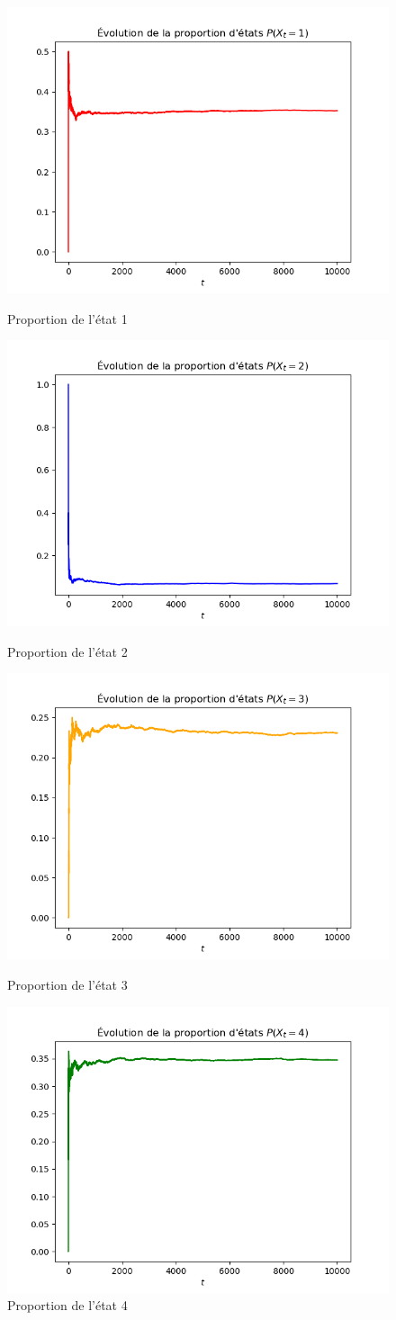\begin{figure}[ht] 
  \begin{minipage}[b]{0.5\linewidth}
    \centering
    \includegraphics[width=.5\linewidth]{figs/evo1.png} 
    \caption{Proportion de l'état 1} 
    \vspace{4ex}
  \end{minipage}%
  \begin{minipage}[b]{0.5\linewidth}
    \centering
    \includegraphics[width=.5\linewidth]{figs/evo2.png} 
    \caption{Proportion de l'état 2} 
    \vspace{4ex}
  \end{minipage} 
  \begin{minipage}[b]{0.5\linewidth}
    \centering
    \includegraphics[width=.5\linewidth]{figs/evo3.png} 
    \caption{Proportion de l'état 3} 
    \vspace{4ex}
  \end{minipage}
  \begin{minipage}[b]{0.5\linewidth}
    \centering
    \includegraphics[width=.5\linewidth]{figs/evo4.png} 
    \caption{Proportion de l'état 4} 
    \vspace{4ex}
  \end{minipage} 
\end{figure}

